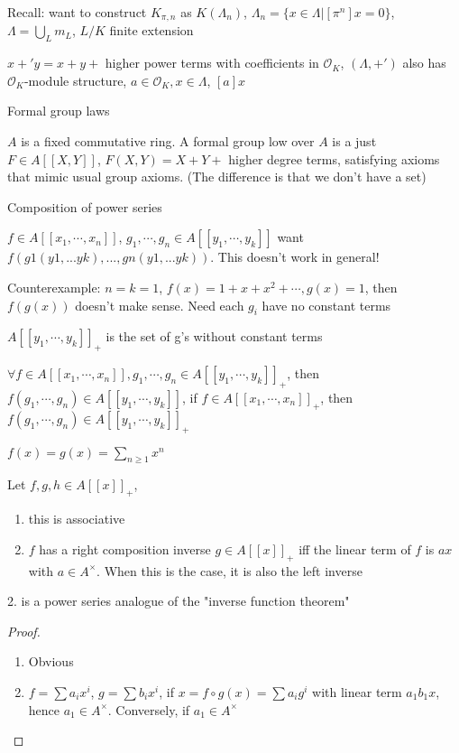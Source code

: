 \documentclass[main]{subfiles}
\begin{document}
Recall: want to construct $K_{\pi,n}$ as $K(\Lambda_n)$, $\Lambda_n=\{x\in\Lambda|[\pi^n]x=0\}$, $\Lambda=\bigcup_L m_L$, $L/K$ finite extension

$x+'y=x+y+$ higher power terms with coefficients in $\mathcal O_K$, $(\Lambda,+')$ also has $\mathcal O_K$-module structure, $a\in \mathcal O_K,x\in \Lambda$, $[a]x$

Formal group laws

$A$ is a fixed commutative ring. A formal group low over $A$ is a just $F\in A[[X,Y]]$, $F(X,Y)=X+Y+$ higher degree terms, satisfying axioms that mimic usual group axioms. (The difference is that we don't have a set)

Composition of power series

$f\in A[[x_1,\cdots,x_n]]$, $g_1,\cdots,g_n\in A[[y_1,\cdots,y_k]]$
want $f(g1(y1,...yk),...,gn(y1,...yk))$. This doesn't work in general!

Counterexample: $n=k=1$, $f(x)=1+x+x^2+\cdots, g(x)=1$, then $f(g(x))$ doesn't make sense. Need each $g_i$ have no constant terms

$A[[y_1,\cdots,y_k]]_+$ is the set of g's without constant terms

$\forall f\in A[[x_1,\cdots,x_n]],g_1,\cdots,g_n\in A[[y_1,\cdots,y_k]]_+$, then $f(g_1,\cdots,g_n)\in A[[y_1,\cdots,y_k]]$, if $f\in A[[x_1,\cdots,x_n]]_+$, then $f(g_1,\cdots,g_n)\in A[[y_1,\cdots,y_k]]_+$

\begin{example}
$f(x)=g(x)=\sum_{n\geq1}x^n$
\end{example}

\begin{lemma}
Let $f,g,h\in A[[x]]_+$,
\begin{enumerate}
\item this is associative
\item $f$ has a right composition inverse $g\in A[[x]]_+$ iff the linear term of $f$ is $ax$ with $a\in A^\times$. When this is the case, it is also the left inverse
\end{enumerate}
\end{lemma}

\begin{remark}
2. is a power series analogue of the "inverse function theorem"
\end{remark}

\begin{proof}
\begin{enumerate}
\item Obvious
\item $f=\sum a_ix^i$, $g=\sum b_ix^i$, if $x=f\circ g(x)=\sum a_ig^i$ with linear term $a_1b_1x$, hence $a_1\in A^\times$. Conversely, if $a_1\in A^\times$
\end{enumerate}
\end{proof}
\end{document}
